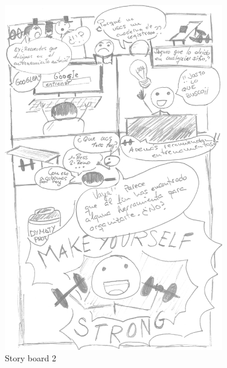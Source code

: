 \documentclass[a4paper]{article}
\begin{document}
\begin{figure}[!h]
\centering
\includegraphics[width=0.85\textwidth]{./figuras/storyboard1-mas-gris.jpg}
\caption{Story board 2}
\end{figure}
\end{document}
